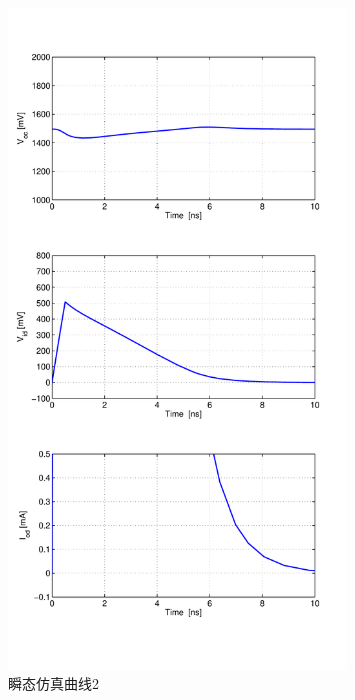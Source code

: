\documentclass[a4paper]{article}
\begin{document}
\begin{figure}[htb]
    \begin{center}
        \includegraphics[width=0.8\textwidth]{common/tran2.pdf}
    \end{center}
    \caption{瞬态仿真曲线2}
    \label{commontran2}
\end{figure}
\newpage
\clearpage
\end{document}
